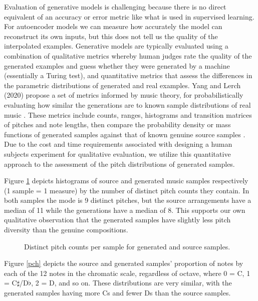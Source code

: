 \documentclass[sigconf,authorversion]{acmart}
\begin{document}
Evaluation of generative models is challenging because there is no
direct equivalent of an accuracy or error metric like what is used in
supervised learning. For autoencoder models we can measure how
accurately the model can reconstruct its own inputs, but this does not
tell us the quality of the interpolated examples. Generative models
are typically evaluated using a combination of qualitative metrics
whereby human judges rate the quality of the generated examples and
guess whether they were generated by a machine (essentially a Turing
test), and quantitative metrics that assess the differences in the
parametric distributions of generated and real examples. Yang and
Lerch (2020) propose a set of metrics informed by music theory, for
probabilistically evaluating how similar the generations are to known
sample distributions of real music \cite{yang_evaluation_2020}. These
metrics include counts, ranges, histograms and transition matrices of
pitches and note lengths, then compare the probability density or mass
functions of generated samples against that of known genuine source
samples \cite{yang_evaluation_2020}. Due to the cost and time
requirements associated with designing a human subjects experiment for
qualitative evaluation, we utilize this quantitative approach to the
assessment of the pitch distributions of generated samples.

Figure \ref{pitch_counts} depicts histograms of source and generated
music samples respectively (1 sample = 1 measure) by the number of
distinct pitch counts they contain. In both samples the mode is 9
distinct pitches, but the source arrangements have a median of 11
while the generations have a median of 8. This supports our own
qualitative observation that the generated samples have slightly less
pitch diversity than the genuine compositions.

\begin{figure}[htbp]
    \begin{center}
        \scalebox{0.6}{}
    \end{center}
    \caption{Distinct pitch counts per sample for generated and source samples.}
    \label{pitch_counts}
\end{figure}

Figure \ref{pch} depicts the source and generated samples' proportion
of notes by each of the 12 notes in the chromatic scale, regardless of
octave, where 0 = C, 1 = C$\sharp$/D$\flat$, 2 = D, and so on. These
distributions are very similar, with the generated samples having more
Cs and fewer Ds than the source samples.
\end{document}
